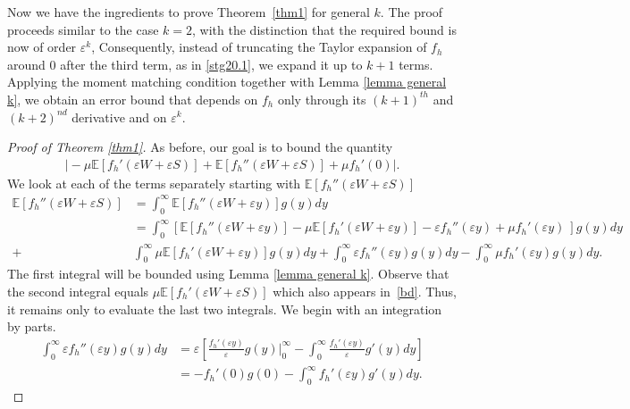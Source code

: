 \documentclass[11pt,letterpaper,reqno]{article}
\theoremstyle{thmstyleone}%
\theoremstyle{thmstyletwo}%
\theoremstyle{thmstylethree}%
\numberwithin{equation}{section}
\begin{document}
Now we have the ingredients to prove Theorem~\ref{thm1} for general $k$. The proof proceeds similar to %
the case $k=2$, with the distinction that the required bound is now of order $\varepsilon^k$, Consequently, instead of truncating the Taylor expansion of $f_h$ around 0 after the third term, as in \eqref{stg20.1}, we expand it up to $k+1$ terms. %
Applying the moment matching condition together with Lemma \ref{lemma general k}, we obtain an error bound that depends on $f_h$ only through its $(k+1)^{th}$ and $(k+2)^{nd}$ derivative and on $\varepsilon^k$.
\begin{proof}[Proof of Theorem \ref{thm1}]
As before, our goal is to bound the quantity
\begin{align}\label{bd}
    \bigg|-\mu \mathbb E[f_h'(\varepsilon W+\varepsilon S)]+ \mathbb E[f_h''(\varepsilon W+\varepsilon S)]+\mu f_h'(0)\bigg|.
\end{align}
We look at each of the terms separately starting with $ \mathbb E[f_h''(\varepsilon W+\varepsilon S)]$
\begin{align}\label{stg19}
\mathbb E[f_h''(\varepsilon W + \varepsilon S)] &=\int_0^\infty \mathbb E[f_h''(\varepsilon W+\varepsilon y)]g(y)dy\\ \nonumber
&=\int_0^\infty \left[\mathbb E[f_h''(\varepsilon W+\varepsilon y)]-\mu \mathbb E[f_h'(\varepsilon W+\varepsilon y)]-\varepsilon f_h''(\varepsilon y)
     +\mu f_h'(\varepsilon y)\ \right] g(y)dy\\ 
   +&\int_0^\infty\mu \mathbb E[f_h'(\varepsilon W+\varepsilon y)]g(y)dy+\int_0^\infty\varepsilon f_h''(\varepsilon y)g(y)dy-\int_0^\infty \mu f_h'(\varepsilon y)g(y)dy .
\end{align}
The first integral will be bounded using Lemma \ref{lemma general k}. Observe that the second integral equals  $\mu \mathbb E[f_h'(\varepsilon W+\varepsilon S)]$ which also appears in~\eqref{bd}. Thus, it remains only to evaluate the last two integrals. We begin with an integration by parts.
\begin{align*}
    \int_0^\infty\varepsilon f_h''(\varepsilon y)g(y)dy&=\varepsilon \left[ \frac{f_h'(\varepsilon y)}{\varepsilon}g(y)\bigg|_0^\infty-\int_0^\infty \frac{f_h'(\varepsilon y)}{\varepsilon }g'(y)dy\right]\\
    &=- f_h'(0)g(0)-\int_0^\infty f_h'(\varepsilon y)g'(y)dy.

\end{align*}
\end{proof}
\end{document}
